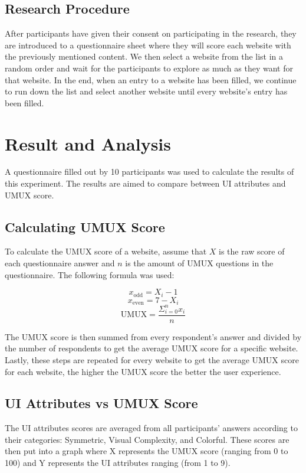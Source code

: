 \documentclass[conference]{IEEEtran}
\begin{document}
\subsection{Research Procedure}

After participants have given their consent on participating in the research, they are introduced to a questionnaire sheet where they will score each website  with the previously mentioned content. We then select a website from the list in a random order and wait for the participants to explore as much as they want for that website. In the end, when an entry to a website has been filled, we continue to run down the list and select another website until every website's entry has been filled.

\section{Result and Analysis}

A questionnaire filled out by 10 participants was used to calculate the results of this experiment. The results are aimed to compare between UI attributes and UMUX score.

\subsection{Calculating UMUX Score}

To calculate the UMUX score of a website, assume that \(X\) is the raw score of each questionnaire answer and \(n\) is the amount of UMUX questions in the questionnaire. The following formula was used:

\[x_{\text{odd}} = X_i - 1\]
\[x_{\text{even}} = 7 - X_i\]
\[\text{UMUX} = \frac{\Sigma^{n}_{i=0}x_i}{n}\]

The UMUX score is then summed from every respondent's answer and divided by the number of respondents to get the average UMUX score for a specific website. Lastly, these steps are repeated for every website to get the average UMUX score for each website, the higher the UMUX score the better the user experience.

\subsection{UI Attributes vs UMUX Score}

The UI attributes scores are averaged from all participants' answers according to their categories: Symmetric, Visual Complexity, and Colorful. These scores are then put into a graph where X represents the UMUX score (ranging from 0 to 100) and Y represents the UI attributes ranging (from 1 to 9).
\end{document}
